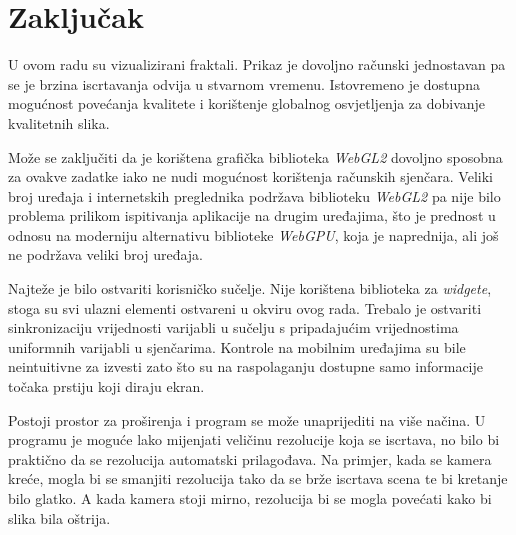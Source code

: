 \documentclass[zavrsnirad, upload]{fer}
\begin{document}

\chapter{Zaključak}
\label{pog:zakljucak}

U ovom radu su vizualizirani fraktali. Prikaz je dovoljno računski jednostavan pa se je brzina iscrtavanja odvija u stvarnom vremenu. Istovremeno je dostupna mogućnost povećanja kvalitete i korištenje globalnog osvjetljenja za dobivanje kvalitetnih slika. 

Može se zaključiti da je korištena grafička biblioteka \emph{WebGL2} dovoljno sposobna za ovakve zadatke iako ne nudi mogućnost korištenja računskih sjenčara. Veliki broj uređaja i internetskih preglednika podržava biblioteku \emph{WebGL2} pa nije bilo problema prilikom ispitivanja aplikacije na drugim uređajima, što je prednost u odnosu na moderniju alternativu biblioteke \emph{WebGPU}, koja je naprednija, ali još ne podržava veliki broj uređaja.

Najteže je bilo ostvariti korisničko sučelje. Nije korištena biblioteka za \emph{widgete}, stoga su svi ulazni elementi ostvareni u okviru ovog rada. Trebalo je ostvariti sinkronizaciju vrijednosti varijabli u sučelju s pripadajućim vrijednostima uniformnih varijabli u sjenčarima. Kontrole na mobilnim uređajima su bile neintuitivne za izvesti zato što su na raspolaganju dostupne samo informacije točaka prstiju koji diraju ekran. 

Postoji prostor za proširenja i program se može unaprijediti na više načina. U programu je moguće lako mijenjati veličinu rezolucije koja se iscrtava, no bilo bi praktično da se rezolucija automatski prilagođava. Na primjer, kada se kamera kreće, mogla bi se smanjiti rezolucija tako da se brže iscrtava scena te bi kretanje bilo glatko. A kada kamera stoji mirno, rezolucija bi se mogla povećati kako bi slika bila oštrija.




\end{document}
